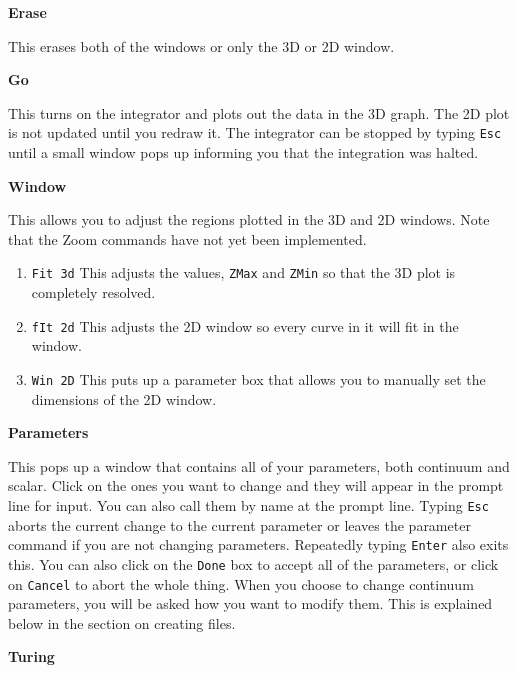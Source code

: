\vspace{.25 in}
\begin{center}
{\bf \large Erase}
\end{center}
This erases both of the windows or only the 3D or 2D window. 

\vspace{.25 in}
\begin{center}
{\bf \large Go}
\end{center}
This turns on the integrator and plots out the data in the 3D graph.
The 2D plot is not updated until you redraw it.  The integrator can be
stopped by typing {\tt Esc} until a small window pops up informing you
that the integration was halted.

\vspace{.25 in}
\begin{center}
{\bf \large Window}
\end{center}
This allows you to adjust the regions plotted in the 3D and 2D
windows.  Note that the Zoom commands have not yet been implemented.
\begin{enumerate}
\item {\tt Fit 3d} This adjusts the values, {\tt ZMax} and {\tt ZMin} 
 so that the 3D plot is completely resolved.
\item {\tt fIt 2d} This adjusts the 2D window so every curve in it
will fit in the window.
\item {\tt Win 2D} This puts up a parameter box that allows you to
manually set the dimensions of the 2D window.
\end{enumerate}  

\vspace{.25 in}
\begin{center}
{\bf \large Parameters}
\end{center}
This pops up a window that contains all of your parameters, both
continuum and scalar.  Click on the ones you want to change and they
will appear in the prompt line for input.  You can also call them by
name at the prompt line.  Typing {\tt Esc} aborts the current change
to the current parameter or leaves the parameter command if you are
not changing parameters.  Repeatedly typing {\tt Enter} also exits
this.  You can also click on the {\tt Done} box to accept all of the
parameters, or click on {\tt Cancel} to abort the whole thing.  When
you choose to change continuum parameters, you will be asked how you
want to modify them.  This is explained below in the section on
creating \xtc files.

\vspace{.25 in}
\begin{center}
{\bf \large Turing}
\end{center}

